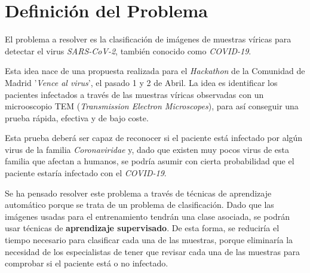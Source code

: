 \documentclass{uc3mpracticas}
\begin{document}
  \frontmatter



  \vspace{40mm}


  \newpage


  \tableofcontents

  \newpage

  \mainmatter


  \section{Definición del Problema}

  El problema a resolver es la clasificación de imágenes de muestras víricas para detectar el virus \textit{SARS-CoV-2}, también conocido como \textit{COVID-19}.

  \vspace{2mm}

  Esta idea nace de una propuesta realizada para el \textit{Hackathon} de la Comunidad de Madrid '\textit{Vence al virus}', el pasado 1 y 2 de Abril. La idea es identificar los pacientes infectados a través de las muestras víricas observadas con un microoscopio TEM (\textit{Transmission Electron Microscopes}), para así conseguir una prueba rápida, efectiva y de bajo coste.

  \vspace{2mm}

  Esta prueba deberá ser capaz de reconocer si el paciente está infectado por algún virus de la familia \textit{Coronaviridae} y, dado que existen muy pocos virus de esta familia que afectan a humanos, se podría asumir con cierta probabilidad que el paciente estaría infectado con el \textit{COVID-19}.

  \vspace{3mm}

  Se ha pensado resolver este problema a través de técnicas de aprendizaje automático porque se trata de un problema de clasificación. Dado que las imágenes usadas para el entrenamiento tendrán una clase asociada, se podrán usar técnicas de \textbf{aprendizaje supervisado}. De esta forma, se reduciría el tiempo necesario para clasificar cada una de las muestras, porque eliminaría la necesidad de los especialistas de tener que revisar cada una de las muestras para comprobar si el paciente está o no infectado.
\end{document}
